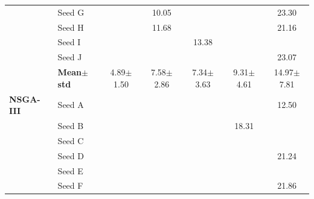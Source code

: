 \begin{table}[H]
{\begin{tabular}{@{}llccccc@{}}
 & Seed G & \cellcolor{RoyalBlue!10}{\small 4.23} & {\small\color{gray!60!black}10.05} & \cellcolor{RoyalBlue!10}{\small 4.88} & \cellcolor{RoyalBlue!10}{\small 6.60} & {\small\color{gray!60!black}23.30} \\
 & Seed H & \cellcolor{RoyalBlue!10}{\small 3.55} & {\small\color{gray!60!black}11.68} & \cellcolor{RoyalBlue!10}{\small 4.87} & \cellcolor{RoyalBlue!10}{\small 7.68} & {\small\color{gray!60!black}21.16} \\
 & Seed I & \cellcolor{RoyalBlue!10}{\small 6.57} & \cellcolor{RoyalBlue!10}{\small 5.03} & {\small\color{gray!60!black}13.38} & \cellcolor{RoyalBlue!10}{\small 8.90} & \cellcolor{RoyalBlue!10}{\small 6.92} \\
 & Seed J & \cellcolor{RoyalBlue!10}{\small 6.08} & \cellcolor{RoyalBlue!10}{\small 4.07} & \cellcolor{RoyalBlue!10}{\small 4.58} & \cellcolor{RoyalBlue!10}{\small 5.14} & {\small\color{gray!60!black}23.07} \\
 & \textbf{Mean$\pm$std} & \cellcolor{RoyalBlue!20}4.89$\pm$1.50 & \cellcolor{RoyalBlue!20}7.58$\pm$2.86 & \cellcolor{RoyalBlue!20}7.34$\pm$3.63 & \cellcolor{RoyalBlue!20}9.31$\pm$4.61 & \cellcolor{red!12}14.97$\pm$7.81 \\
\midrule
\textbf{NSGA-III} & Seed A & \cellcolor{RoyalBlue!10}{\small 1.64} & \cellcolor{RoyalBlue!10}{\small 3.70} & \cellcolor{RoyalBlue!10}{\small 5.66} & \cellcolor{RoyalBlue!10}{\small 9.68} & {\small\color{gray!60!black}12.50} \\
 & Seed B & \cellcolor{RoyalBlue!10}{\small 4.79} & \cellcolor{RoyalBlue!10}{\small 4.36} & \cellcolor{RoyalBlue!10}{\small 4.95} & {\small\color{gray!60!black}18.31} & \cellcolor{RoyalBlue!10}{\small 5.88} \\
 & Seed C & \cellcolor{RoyalBlue!10}{\small 5.98} & \cellcolor{RoyalBlue!10}{\small 9.30} & \cellcolor{RoyalBlue!10}{\small 5.10} & \cellcolor{RoyalBlue!10}{\small 5.45} & \cellcolor{RoyalBlue!10}{\small 6.60} \\
 & Seed D & \cellcolor{RoyalBlue!10}{\small 3.97} & \cellcolor{RoyalBlue!10}{\small 9.25} & \cellcolor{RoyalBlue!10}{\small 5.09} & \cellcolor{RoyalBlue!10}{\small 4.96} & {\small\color{gray!60!black}21.24} \\
 & Seed E & \cellcolor{RoyalBlue!10}{\small 3.62} & \cellcolor{RoyalBlue!10}{\small 4.35} & \cellcolor{RoyalBlue!10}{\small 5.02} & \cellcolor{RoyalBlue!10}{\small 4.92} & \cellcolor{RoyalBlue!10}{\small 5.14} \\
 & Seed F & \cellcolor{RoyalBlue!10}{\small 4.03} & \cellcolor{RoyalBlue!10}{\small 3.90} & \cellcolor{RoyalBlue!10}{\small 4.57} & \cellcolor{RoyalBlue!10}{\small 5.50} & {\small\color{gray!60!black}21.86} \\

\end{tabular}}
\end{table}
